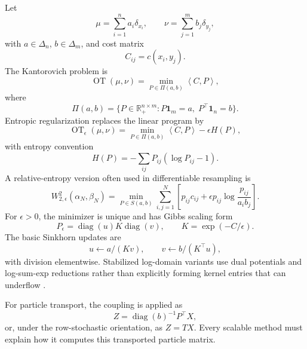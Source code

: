 \documentclass[11pt]{article}
\newcommand{\R}{\mathbb{R}}
\newcommand{\ones}{\mathbf{1}}
\newcommand{\diag}{\operatorname{diag}}
\newcommand{\OT}{\operatorname{OT}}
\newcommand{\inner}[2]{\left\langle #1,#2\right\rangle}
\begin{document}
Let
\begin{equation}
\mu=\sum_{i=1}^n a_i\delta_{x_i},
\qquad
\nu=\sum_{j=1}^m b_j\delta_{y_j},
\label{eq:general-empirical}
\end{equation}
with $a\in\Delta_n$, $b\in\Delta_m$, and cost matrix
\begin{equation}
C_{ij}=c(x_i,y_j).
\label{eq:cost-matrix}
\end{equation}
The Kantorovich problem is
\begin{equation}
\OT(\mu,\nu)
=
\min_{P\in\Pi(a,b)} \inner{C}{P},
\label{eq:kantorovich}
\end{equation}
where
\begin{equation}
\Pi(a,b)
=
\{P\in\R_+^{n\times m}:P\ones_m=a,\;P^\top\ones_n=b\}.
\label{eq:general-polytope}
\end{equation}
Entropic regularization replaces the linear program by
\citep{cuturi2013sinkhorn,peyre2019computational}
\begin{equation}
\OT_\epsilon(\mu,\nu)
=
\min_{P\in\Pi(a,b)}
\inner{C}{P}
-\epsilon H(P),
\label{eq:entropic-ot}
\end{equation}
with entropy convention
\begin{equation}
H(P)=-\sum_{ij}P_{ij}(\log P_{ij}-1).
\label{eq:entropy}
\end{equation}
A relative-entropy version often used in differentiable resampling is
\begin{equation}
W^2_{2,\epsilon}(\alpha_N,\beta_N)
=
\min_{P\in S(a,b)}
\sum_{i,j=1}^N
\left[
  p_{ij}c_{ij}
  + \epsilon p_{ij}\log\frac{p_{ij}}{a_i b_j}
\right].
\label{eq:relative-entropic-ot}
\end{equation}
For $\epsilon>0$, the minimizer is unique and has Gibbs scaling form
\begin{equation}
P_\epsilon
=
\diag(u)K\diag(v),
\qquad
K=\exp(-C/\epsilon).
\label{eq:gibbs-scaling}
\end{equation}
The basic Sinkhorn updates are
\begin{equation}
u \leftarrow a/(Kv),
\qquad
v \leftarrow b/(K^\top u),
\label{eq:sinkhorn-updates}
\end{equation}
with division elementwise.  Stabilized log-domain variants use dual potentials
and log-sum-exp reductions rather than explicitly forming kernel entries that
can underflow \citep{schmitzer2019stabilized}.

For particle transport, the coupling is applied as
\begin{equation}
Z
=
\diag(b)^{-1}P^\top X,
\label{eq:coupling-application}
\end{equation}
or, under the row-stochastic orientation, as $Z=TX$.  Every scalable method
must explain how it computes this transported particle matrix.
\end{document}
